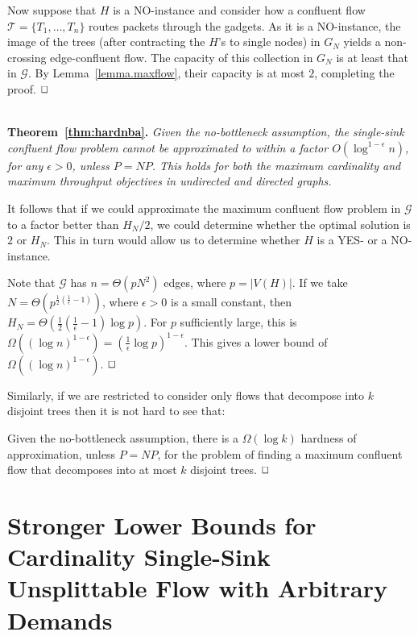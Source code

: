 \documentclass[12pt]{article}
\newcommand{\qed}{$\hfill{\Box}$}
\begin{document}
Now  suppose that $H$ is a NO-instance and
consider how a confluent
flow $\mathcal{T}=\{T_1,\dots, T_n\}$ routes packets through the gadgets.
As it is a NO-instance,
the image of the  trees (after contracting the $H$'s to single nodes) in $G_N$ yields a non-crossing edge-confluent flow.
The capacity of this collection in $G_N$ is at least that in $\mathcal{G}$.
By Lemma~\ref{lemma.maxflow}, their capacity is at most $2$, completing the proof.
\qed

\ \\
{{\noindent\bf Theorem~\ref{thm:hardnba}.} \itshape
Given the no-bottleneck assumption, the single-sink confluent flow problem
cannot be approximated to within a factor $O(\log^{1-\epsilon}n)$, for any $\epsilon > 0$, unless $P=NP$.
This holds for both the maximum cardinality and maximum throughput objectives
in undirected and directed graphs.\\
}

  It follows that if we could
approximate the maximum confluent flow problem in $\mathcal{G}$ to a
factor better than $H_N/2$, we could determine whether the optimal solution is
$2$ or $H_N$. This in turn would allow us to determine whether $H$ is a YES-
or a NO-instance.

Note that $\mathcal{G}$ has $n=\Theta(pN^2)$ edges, where $p=|V(H)|$. If we
take $N = \Theta(p^{\frac12(\frac{1}{\epsilon}-1)})$, where $\epsilon>0$ is a
small constant, then $H_N=\Theta(\frac{1}{2}(\frac{1}{\epsilon}-1) \log p)$. For $p$ sufficiently large,
this is $\Omega((\log n)^{1-\epsilon}) = (\frac{1}{\epsilon} \log p )^{1-\epsilon}$.  This gives a
lower bound of $\Omega((\log n)^{1-\epsilon})$.  \qed

Similarly, if we are restricted to consider only flows that decompose into $k$
disjoint trees then it is not hard to see that:
\begin{thm}
Given the no-bottleneck assumption, there is a $\Omega(\log k)$ hardness of
approximation, unless $P=NP$, for the problem of finding a maximum confluent flow that
decomposes into at most $k$ disjoint trees. \qed
\end{thm}








\section{Stronger Lower Bounds for Cardinality Single-Sink Unsplittable Flow with Arbitrary Demands}\label{sec:stronger}
\end{document}
